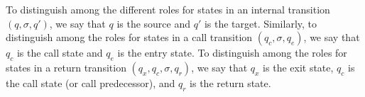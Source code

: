 To distinguish among the different roles for states in an internal
transition $(q,\sigma,q')$, we say that $q$ is the source and $q'$ is the
target.  Similarly, to distinguish among the roles for states in a call
transition $(q_c,\sigma,q_e)$, we say that $q_c$ is the call state and $q_e$
is the entry state. To distinguish among the roles for states in a return
transition $(q_x,q_c,\sigma,q_r)$, we say that $q_x$ is the exit state,
$q_c$ is the call state (or call predecessor), and $q_r$ is the return state.
